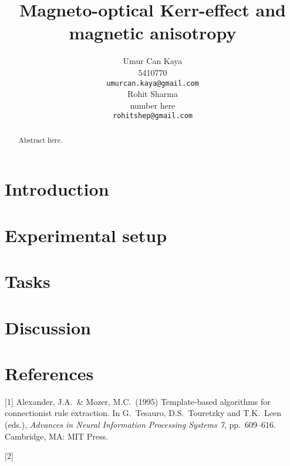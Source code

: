 \documentclass{article}
\title{Magneto-optical Kerr-effect and magnetic anisotropy}
\author{
Umur Can Kaya\\
5410770\\
\texttt{umurcan.kaya@gmail.com}\\
\And
Rohit Sharma\\
number here\\
\texttt{rohitshep@gmail.com}\\
}
\begin{document}
\maketitle

\begin{abstract}
Abstract here.
\end{abstract}

\section{Introduction}
\section{Experimental setup}
\section{Tasks}
\section{Discussion}





\section*{References}

[1] Alexander, J.A.\ \& Mozer, M.C.\ (1995) Template-based algorithms for
connectionist rule extraction. In G.\ Tesauro, D.S.\ Touretzky and T.K.\ Leen
(eds.), {\it Advances in Neural Information Processing Systems 7},
pp.\ 609--616. Cambridge, MA: MIT Press.

[2]
\end{document}
